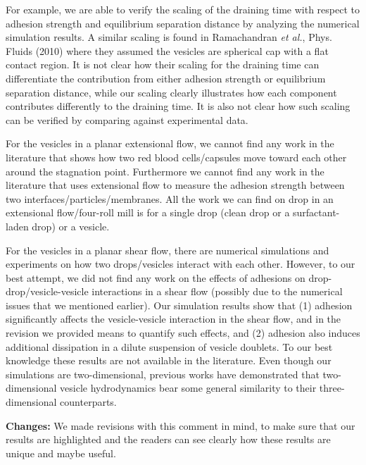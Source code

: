 \documentclass[11pt]{article}
\begin{document}
\begin{enumerate}
\begin{itemize}
For example, we are able to verify the scaling of the draining time with respect to adhesion strength and equilibrium separation distance by analyzing the numerical simulation results. 
A similar scaling is found in Ramachandran {\it et al.}, Phys. Fluids (2010) where they assumed the vesicles are spherical cap with a flat contact region. It is not clear how their scaling for the draining time can differentiate the contribution from either adhesion strength or equilibrium separation distance, while our scaling clearly illustrates how each component contributes differently to the draining time. It is also not clear how such scaling can be verified by comparing against experimental data.

For the vesicles in a planar extensional flow, we cannot find any work in the literature that shows how two red blood cells/capsules move toward each other around the stagnation point. Furthermore we cannot find any work in the literature that uses extensional flow to measure the adhesion strength between two interfaces/particles/membranes. All the work we can find on drop in an extensional flow/four-roll mill is for a single drop (clean drop or a surfactant-laden drop) or a vesicle.

For the vesicles in a planar shear flow, there are numerical simulations and experiments on how two drops/vesicles interact with each other. 
However, to our best attempt, we did not find any work on the effects of adhesions on drop-drop/vesicle-vesicle interactions in a shear flow (possibly due to the numerical issues that we mentioned earlier). Our simulation results show that (1) adhesion significantly affects the vesicle-vesicle interaction in the shear flow, and in the revision we provided means to quantify such effects, and (2) adhesion also induces additional dissipation in a dilute suspension of vesicle doublets. To our best knowledge these results are not available in the literature. Even though our simulations are two-dimensional, previous works have demonstrated that two-dimensional vesicle hydrodynamics bear some general similarity to their three-dimensional counterparts. 

{\bf Changes:} We made revisions with this comment in mind, to make sure that our results are highlighted and the readers can see clearly how these results are unique and maybe useful.
  
  
\end{itemize}


\end{enumerate}
\end{document}
